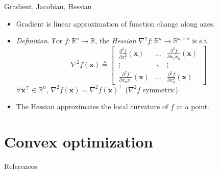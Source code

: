 \documentclass{beamer}
\numberwithin{equation}{section}
\begin{document}
\begin{frame}{Gradient, Jacobian, Hessian}
    \begin{itemize}
        \item
        Gradient is linear approximation of function change along axes.

        \item
        \textit{Definition.} For $ f : \mathbb{R}^n \rightarrow \mathbb{R} $,
        the \textit{Hessian} $ \nabla^2f : \mathbb{R}^n \rightarrow
        \mathbb{R}^{n \times n} $ is s.t.
        \begin{equation*}
            \nabla^2 f(\mathbf{x}) \triangleq \begin{bmatrix}
                \ \frac{\partial^2 f}{\partial x_1^2}(\mathbf{x}) & \ldots &
                    \frac{\partial^2 f}{\partial x_1x_n}(\mathbf{x}) \ \\
                \ \vdots & \ddots & \vdots \ \\
                \ \frac{\partial^2 f}{\partial x_nx_1}(\mathbf{x}) & \ldots &
                    \frac{\partial^2 f}{\partial x_n^2}(\mathbf{x}) \
            \end{bmatrix}
        \end{equation*}
        $ \forall \mathbf{x}^\top \in \mathbb{R}^n $, $ \nabla^2f(\mathbf{x})
        = \nabla^2f(\mathbf{x})^\top $ ($ \nabla^2f $ symmetric).

        \item
        The Hessian approximates the local curvature of $ f $ at a point.
    \end{itemize}
\end{frame}

\section{Convex optimization}

\begin{frame}{References}
    
    
\end{frame}
\end{document}
